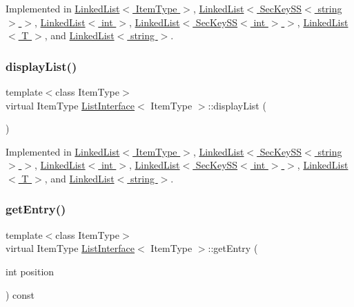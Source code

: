 Implemented in \hyperlink{classLinkedList_a7dc3cca217b45c6fe5d28c9d16b7bf9e}{Linked\+List$<$ Item\+Type $>$}, \hyperlink{classLinkedList_a7dc3cca217b45c6fe5d28c9d16b7bf9e}{Linked\+List$<$ Sec\+Key\+S\+S$<$ string $>$ $>$}, \hyperlink{classLinkedList_a7dc3cca217b45c6fe5d28c9d16b7bf9e}{Linked\+List$<$ int $>$}, \hyperlink{classLinkedList_a7dc3cca217b45c6fe5d28c9d16b7bf9e}{Linked\+List$<$ Sec\+Key\+S\+S$<$ int $>$ $>$}, \hyperlink{classLinkedList_a7dc3cca217b45c6fe5d28c9d16b7bf9e}{Linked\+List$<$ T $>$}, and \hyperlink{classLinkedList_a7dc3cca217b45c6fe5d28c9d16b7bf9e}{Linked\+List$<$ string $>$}.

\mbox{\label{classListInterface_a2f2f533e962dd89111ee50b972dc28e7}} 
\subsubsection{\texorpdfstring{display\+List()}{displayList()}}
{\footnotesize\ttfamily template$<$class Item\+Type$>$ \\
virtual Item\+Type \hyperlink{classListInterface}{List\+Interface}$<$ Item\+Type $>$\+::display\+List (\begin{DoxyParamCaption}{ }\end{DoxyParamCaption})\hspace{0.3cm}{\ttfamily [pure virtual]}}



Implemented in \hyperlink{classLinkedList_a65fb58d9f9b8af41e9569d1dc3200583}{Linked\+List$<$ Item\+Type $>$}, \hyperlink{classLinkedList_a65fb58d9f9b8af41e9569d1dc3200583}{Linked\+List$<$ Sec\+Key\+S\+S$<$ string $>$ $>$}, \hyperlink{classLinkedList_a65fb58d9f9b8af41e9569d1dc3200583}{Linked\+List$<$ int $>$}, \hyperlink{classLinkedList_a65fb58d9f9b8af41e9569d1dc3200583}{Linked\+List$<$ Sec\+Key\+S\+S$<$ int $>$ $>$}, \hyperlink{classLinkedList_a65fb58d9f9b8af41e9569d1dc3200583}{Linked\+List$<$ T $>$}, and \hyperlink{classLinkedList_a65fb58d9f9b8af41e9569d1dc3200583}{Linked\+List$<$ string $>$}.

\mbox{\label{classListInterface_a86987f69e5056d287212ede41db1956a}} 
\subsubsection{\texorpdfstring{get\+Entry()}{getEntry()}}
{\footnotesize\ttfamily template$<$class Item\+Type$>$ \\
virtual Item\+Type \hyperlink{classListInterface}{List\+Interface}$<$ Item\+Type $>$\+::get\+Entry (\begin{DoxyParamCaption}\item[{int}]{position }\end{DoxyParamCaption}) const\hspace{0.3cm}{\ttfamily [pure virtual]}}

